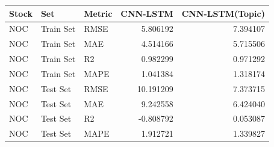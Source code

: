 \begin{tabular}{lllrr}
\toprule
Stock & Set & Metric & CNN-LSTM & CNN-LSTM(Topic) \\
\midrule
NOC & Train Set & RMSE & 5.806192 & 7.394107 \\
NOC & Train Set & MAE & 4.514166 & 5.715506 \\
NOC & Train Set & R2 & 0.982299 & 0.971292 \\
NOC & Train Set & MAPE & 1.041384 & 1.318174 \\
NOC & Test Set & RMSE & 10.191209 & 7.373715 \\
NOC & Test Set & MAE & 9.242558 & 6.424040 \\
NOC & Test Set & R2 & -0.808792 & 0.053087 \\
NOC & Test Set & MAPE & 1.912721 & 1.339827 \\
\bottomrule
\end{tabular}
